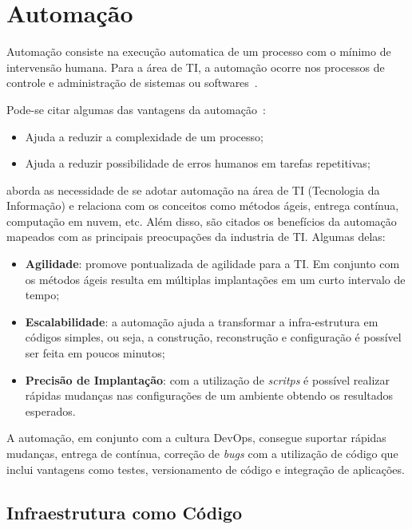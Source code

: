 \section{Automação}
\label{sec:auto}

Automação consiste na execução automatica de um processo com o mínimo de
intervensão humana. Para a área de TI, a automação ocorre nos processos de
controle e administração de sistemas ou softwares~\cite{sharma:2015}.

Pode-se citar algumas das vantagens da automação~\cite{sharma:2015}:
\begin{itemize}
  \item Ajuda a reduzir a complexidade de um processo;
  \item Ajuda a reduzir possibilidade de erros humanos em tarefas
    repetitivas;
\end{itemize}

 aborda as necessidade de se adotar automação na área
de TI (Tecnologia da Informação) e relaciona com os conceitos como métodos
ágeis, entrega contínua, computação em nuvem, etc. Além disso, são citados
os benefícios da automação mapeados com as principais preocupações da industria
de TI. Algumas delas:
\begin{itemize}
  \item \textbf{Agilidade}: promove pontualizada de agilidade para a TI. Em conjunto
    com os métodos ágeis resulta em múltiplas implantações em um curto intervalo
    de tempo;
  \item \textbf{Escalabilidade}: a automação ajuda a transformar a infra-estrutura
    em códigos simples, ou seja, a construção, reconstrução e configuração é possível
    ser feita em poucos minutos;
  \item \textbf{Precisão de Implantação}: com a utilização de \textit{scritps}
    é possível realizar rápidas mudanças nas configurações de um ambiente
    obtendo os resultados esperados.
\end{itemize}

A automação, em conjunto com a cultura DevOps, consegue suportar rápidas mudanças,
entrega de contínua, correção de \textit{bugs} com a utilização de código que inclui
vantagens como testes, versionamento de código e integração de aplicações.

\subsection{Infraestrutura como Código}


